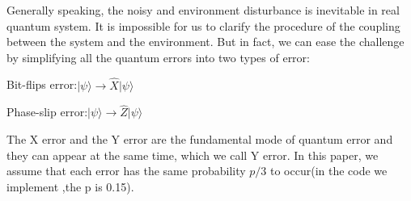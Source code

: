\documentclass[
    a4paper, %
    10pt, %
    unnumberedsections, %
    twoside, %
]{LTJournalArticle}
\begin{document}
Generally speaking, the noisy and environment disturbance is inevitable in real quantum system. It is impossible for us to clarify the procedure of the coupling between the system and the environment. But in fact, we can ease the challenge by simplifying all the quantum errors into two types of error:
\begin{center}
Bit-flips error:$\vert \psi \rangle \rightarrow \hat{X} \vert \psi \rangle$
\end{center}
\begin{center}
Phase-slip error:$\vert \psi \rangle \rightarrow \hat{Z} \vert \psi \rangle$
\end{center}
The X error and the Y error are the fundamental mode of quantum error and they can appear at the same time, which we call Y error. In this paper, we assume that each error has the same probability $p/3$ to occur(in the code we implement ,the p is 0.15).
\end{document}

